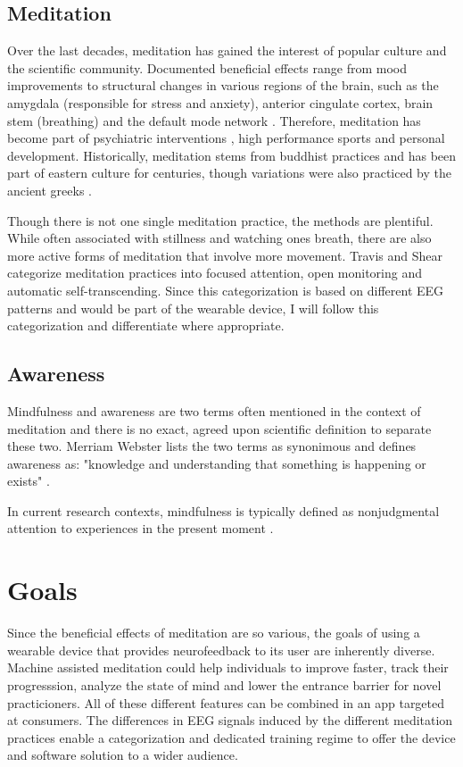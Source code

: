 \documentclass{llncs} %
\begin{document}
\subsection{Meditation}
Over the last decades, meditation has gained the interest of popular culture and the scientific community.
Documented beneficial effects range from mood improvements to structural changes \cite{Davidson} in various regions of the brain, such as the amygdala (responsible for stress and anxiety), anterior cingulate cortex, brain stem (breathing)
and the default mode network \cite{Tang:et al}.
Therefore, meditation has become part of psychiatric interventions \cite{Hoelzel}, high performance sports and personal development.
Historically, meditation stems from buddhist practices and has been part of eastern culture for centuries, though variations were also practiced by the ancient greeks \cite{Hadot:Davidson}.

Though there is not one single meditation practice, the methods are plentiful. While often associated with stillness and watching ones breath,
there are also more active forms of meditation that involve more movement. Travis and Shear categorize meditation practices into focused attention, open monitoring and automatic self-transcending.\cite{Travis} 
Since this categorization is based on different EEG patterns and would be part of the wearable device, I will follow this categorization and differentiate where appropriate.
\subsection{Awareness}
Mindfulness and awareness are two terms often mentioned in the context of meditation and there is no exact, agreed upon scientific definition to separate these two. Merriam Webster lists the two terms as synonimous and defines awareness as: "knowledge and understanding that something is happening or exists" \cite{Merriam:Webster}. 

In current research contexts, mindfulness is typically defined as nonjudgmental attention to experiences in the present moment \cite{Kabat-Zinn}.
\section{Goals}
Since the beneficial effects of meditation are so various, the goals of using a wearable device 
that provides neurofeedback to its user are inherently diverse. Machine assisted meditation could help individuals to 
improve faster, track their progresssion, analyze the state of mind and lower the entrance barrier for novel practicioners. \cite{brand:del}
All of these different features can be combined in an app targeted at consumers. 
The differences in EEG signals induced by the different meditation practices enable a categorization
and dedicated training regime to offer the device and software solution to a wider audience. \cite{Travis}
\end{document}
